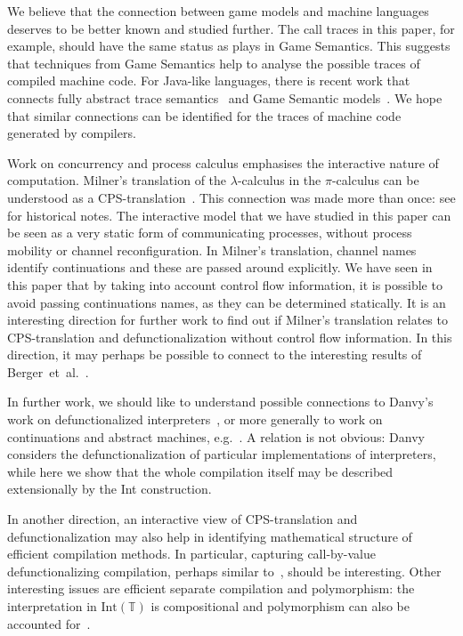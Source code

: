 \documentclass{LMCS}
\theoremstyle{definition}
\theoremstyle{plain}
\newcommand{\TT}{\mathbb{T}}
\newcommand{\Int}[1]{\textrm{Int}(#1)}
\begin{document}
We believe that the connection between game models and machine languages 
deserves to be better known and studied further.
The call traces in this paper, for example, should 
have the same status as plays in Game Semantics.
This suggests that techniques from
Game Semantics help to analyse the possible traces 
of compiled machine code.
For Java-like languages, there is recent work that connects 
fully abstract trace semantics~\cite{DBLP:conf/esop/JeffreyR05} and
Game Semantic models~\cite{DBLP:conf/popl/MurawskiT14}.
We hope that similar connections can be identified for the traces of 
machine code generated by compilers.

Work on concurrency and process calculus emphasises the interactive nature of 
computation. 
Milner's translation of the $\lambda$-calculus in the 
$\pi$-calculus \cite{DBLP:journals/mscs/Milner92} can be understood
as a CPS-translation~\cite{DBLP:journals/mscs/Sangiorgi99}. 
This connection was made more than once: see
\cite[\S10]{DBLP:journals/mscs/Sangiorgi99} for historical notes.
The interactive model that we have studied in this paper can be seen
as a very static form of communicating processes,
without process mobility or channel reconfiguration.
In Milner's translation, channel names identify continuations and these
are passed around explicitly. We have seen in this paper that 
by taking into account control flow information, it is possible
to avoid passing continuations names, as they can be determined statically.
It is an interesting direction for further work to find out if
Milner's translation relates to CPS-translation and defunctionalization
without control flow information. 
In this direction, it may perhaps be possible to connect to 
the interesting results of Berger~et~al.~\cite{BergerHY01}.

In further work, we should like to understand possible connections 
to Danvy's work on defunctionalized interpreters~\cite{danvy},
or more generally to work on continuations and abstract machines, 
e.g.~\cite{DanosHerbelinRegnier,DBLP:journals/jfp/StreicherR98}. 
A relation is not obvious: Danvy considers the 
defunctionalization of particular implementations of interpreters,
while here we show that the whole compilation itself may be
described extensionally by the Int construction. 

In another direction, an interactive view of CPS-translation and
defunctionalization may also help in identifying mathematical structure
of efficient compilation methods. In particular, capturing call-by-value 
defunctionalizing compilation, perhaps similar to~\cite{DBLP:conf/esop/CejtinJW00},
should be interesting. Other interesting issues are 
efficient separate compilation and polymorphism: 
the interpretation in $\Int\TT$ is compositional
and polymorphism can also be accounted for~\cite{Schopp07}.
\end{document}
